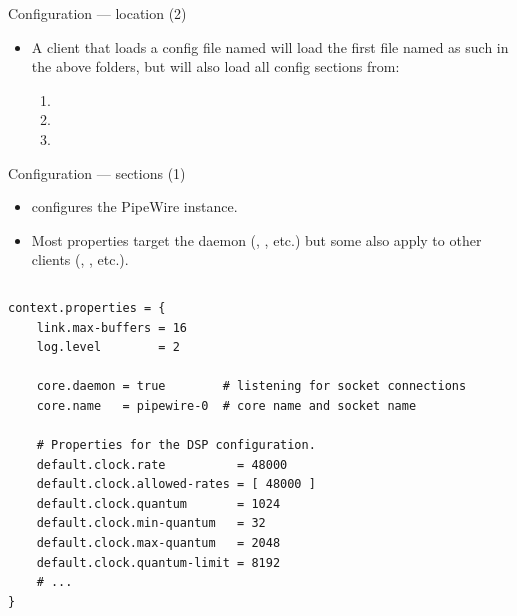 \begin{frame}{Configuration — location (2)}
  \begin{itemize}

  \item A client that loads a config file named 
    will load the first file named as such in the above folders, but
    will also load all config sections from:

    \begin{enumerate}
    \item {}
    \item {}
    \item {}
    \end{enumerate}

  \end{itemize}
\end{frame}



\begin{frame}[fragile]{Configuration — sections (1)}

  \begin{itemize}
  \item {} configures the PipeWire instance.

  \item Most properties target the daemon
    (,
    , etc.) but some also apply to
    other clients (, , etc.).
  \end{itemize}

  \begin{columns}
    \begin{block}{}
      \fontsize{8}{8}\selectfont
        \begin{verbatim}
context.properties = {
    link.max-buffers = 16
    log.level        = 2

    core.daemon = true        # listening for socket connections
    core.name   = pipewire-0  # core name and socket name

    # Properties for the DSP configuration.
    default.clock.rate          = 48000
    default.clock.allowed-rates = [ 48000 ]
    default.clock.quantum       = 1024
    default.clock.min-quantum   = 32
    default.clock.max-quantum   = 2048
    default.clock.quantum-limit = 8192
    # ...
}
        \end{verbatim}
      \end{block}
  \end{columns}

\end{frame}



